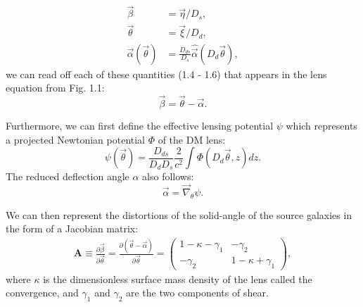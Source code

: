 \begin{align}
	\vec{\beta} &= \vec{\eta} / D_s,\\
	\vec{\theta} &= \vec{\xi} / D_d, \\
	\vec{\alpha}(\vec{\theta}) &=
	\frac{D_{ds}}{D_s}\hat{\vec{\alpha}}(D_d\vec{\theta}),
\end{align}
we can read off each of these quantities (1.4 - 1.6) that appears in the lens
equation from Fig. 1.1:
\begin{equation}
	\vec{\beta} = \vec{\theta} - \vec{\alpha}.
	\label{eq:lens_equation}
\end{equation}


Furthermore, we can first define the effective lensing potential 
$\psi$ which represents a projected Newtonian potential $\Phi$ of the DM lens: 
\begin{equation}
	\psi(\vec{\theta}) = \frac{D_{ds}}{D_d D_s} \frac{2}{c^2} \int \Phi(D_d
	\vec{\theta}, z) dz.
\end{equation}
The reduced deflection angle $\alpha$ also follows:  
\begin{equation}
	\vec{\alpha} = \vec{\nabla}_\theta \psi.
\end{equation}

We can then represent the
distortions of the solid-angle of
the source galaxies in the form of a Jacobian matrix:  
\begin{align}
	\mathbf{A} \equiv \frac{\partial \vec{\beta}}{\partial \vec{\theta}} =
	\frac{\partial (\vec{\theta} - \vec{\alpha})}{\partial \vec{\theta}} =
	\left(
\begin{array}{cc}
1 - \kappa - \gamma_1 & - \gamma_2 \\
- \gamma_2 & 1 - \kappa + \gamma_1
\end{array}
\right),
\end{align}
where $\kappa$ is the dimensionless surface mass density of the lens called the
convergence, and $\gamma_1$ and $\gamma_2$ are the two components of shear.
  
